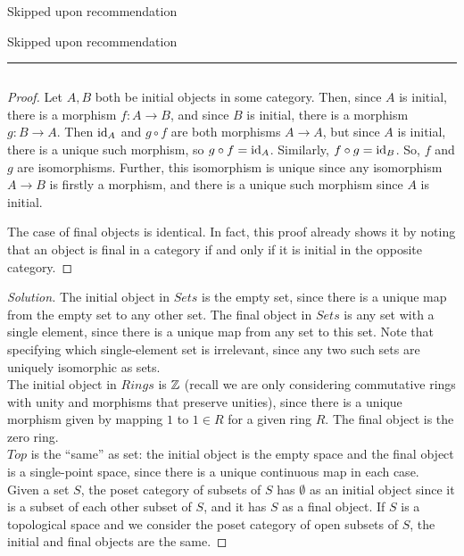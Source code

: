 \documentclass[12pt]{exam}
\begin{document}
 Skipped upon recommendation

 Skipped upon recommendation \\

\hrule ${}$ \\

\begin{proof}
	Let $A,B$ both be initial objects in some category. Then, since $A$ is initial, there is a morphism $f : A \to B$, and since $B$ is initial, there is a morphism $g : B \to A$. Then $\operatorname{id}_A$ and $g \circ f$ are both morphisms $A \to A$, but since $A$ is initial, there is a unique such morphism, so $g \circ f = \operatorname{id}_A$. Similarly, $f \circ g = \operatorname{id}_B$. So, $f$ and $g$ are isomorphisms. Further, this isomorphism is unique since any isomorphism $A \to B$ is firstly a morphism, and there is a unique such morphism since $A$ is initial.
	
	The case of final objects is identical. In fact, this proof already shows it by noting that an object is final in a category if and only if it is initial in the opposite category.
\end{proof}

\begin{proof}[Solution]
	The initial object in $Sets$ is the empty set, since there is a unique map from the empty set to any other set. The final object in $Sets$ is any set with a single element, since there is a unique map from any set to this set. Note that specifying which single-element set is irrelevant, since any two such sets are uniquely isomorphic as sets. \\
	
	The initial object in $Rings$ is $\mathbb{Z}$ (recall we are only considering commutative rings with unity and morphisms that preserve unities), since there is a unique morphism given by mapping $1$ to $1 \in R$ for a given ring $R$. The final object is the zero ring. \\
	
	$Top$ is the ``same'' as set: the initial object is the empty space and the final object is a single-point space, since there is a unique continuous map in each case. \\
	
	Given a set $S$, the poset category of subsets of $S$ has $\emptyset$ as an initial object since it is a subset of each other subset of $S$, and it has $S$ as a final object. If $S$ is a topological space and we consider the poset category of open subsets of $S$, the initial and final objects are the same.
\end{proof}
\end{document}
